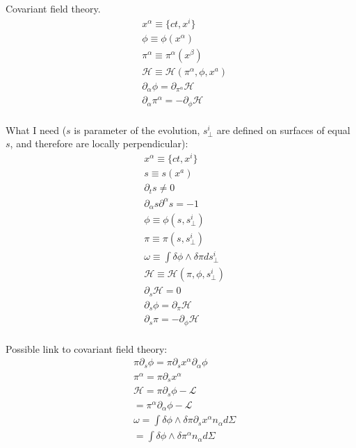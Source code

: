 \documentclass[aps,pra,10pt,twocolumn,floatfix,nofootinbib]{revtex4-1}
\theoremstyle{definition}
\begin{document}
Covariant field theory.
\begin{align*}
&x^\alpha\equiv\{ct, x^i\} \\
&\phi\equiv\phi(x^\alpha) \\
&\pi^\alpha\equiv\pi^\alpha(x^\beta) \\
&\mathcal{H}\equiv\mathcal{H}(\pi^\alpha, \phi, x^a) \\
&\partial_{\alpha}\phi = \partial_{\pi^\alpha} \mathcal{H} \\
&\partial_{\alpha}\pi^\alpha = - \partial_{\phi} \mathcal{H} \\
\end{align*}

What I need ($s$ is parameter of the evolution, $s_\perp^i$ are defined on surfaces of equal $s$, and therefore are locally perpendicular):
\begin{align*}
&x^\alpha\equiv\{ct, x^i\} \\
&s\equiv s(x^a) \\
&\partial_ts \neq 0 \\
&\partial_\alpha s \partial^\alpha s = -1 \\
&\phi\equiv\phi(s, s_\perp^i) \\
&\pi\equiv\pi(s, s_\perp^i) \\
&\omega \equiv \int \delta\phi \wedge \delta\pi ds_\perp^i \\
&\mathcal{H}\equiv\mathcal{H}(\pi, \phi, s_{\perp}^i) \\
&\partial_s\mathcal{H}=0 \\
&\partial_s\phi = \partial_{\pi} \mathcal{H} \\
&\partial_s\pi = - \partial_{\phi} \mathcal{H} \\
\end{align*}

Possible link to covariant field theory:
\begin{align*}
&\pi\partial_s\phi = \pi\partial_s x^\alpha \partial_\alpha \phi \\
&\pi^\alpha = \pi\partial_s x^\alpha \\
&\mathcal{H} = \pi\partial_s\phi - \mathcal{L} \\
&= \pi^\alpha \partial_\alpha \phi - \mathcal{L} \\
&\omega = \int \delta\phi \wedge \delta\pi \partial_s x^\alpha n_\alpha d\Sigma \\
&= \int \delta\phi \wedge \delta\pi^\alpha n_\alpha d\Sigma \\
\end{align*}
\end{document}
